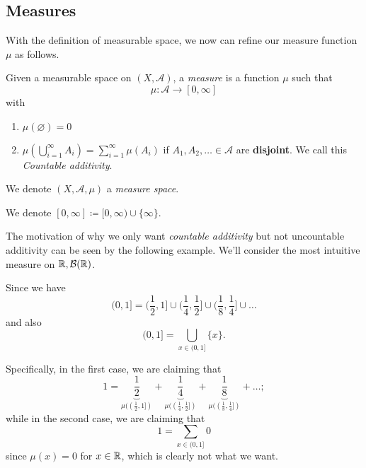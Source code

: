 \subsection{Measures}
With the definition of measurable space, we now can refine our measure function \(\mu\) as follows.
\begin{definition}[Measure]\label{def:measure}
	Given a measurable space on \((X, \mathcal{A}) \), a \emph{measure} is a function \(\mu\) such that
	\[
		\mu\colon \mathcal{A} \to [0, \infty]
	\]
	with
	\begin{enumerate}
		\item\label{def:measure-empty-measure} \(\mu(\varnothing ) = 0\)
		\item\label{def:measure-countable-additivity} \(\mu\left(\bigcup\limits_{i=1}^{\infty} A_{i}\right) = \sum\limits_{i=1}^{\infty}\mu(A_{i})\) if \(A_1, A_2, \ldots \in \mathcal{A}\)
		are \textbf{disjoint}. We call this \emph{Countable additivity}.
	\end{enumerate}
	We denote \((X, \mathcal{A} , \mu)\) a \emph{measure space}\label{def:measure-space}.
\end{definition}

\begin{notation}
	We denote \([0, \infty] \coloneqq [0, \infty) \cup \{\infty\}\).
\end{notation}

\begin{remark}
	The motivation of why we only want \emph{countable additivity} but not uncountable additivity can be seen by the following example. We'll consider
	the most intuitive measure on \(\mathbb{\MakeUppercase{R}} , \mathcal{B} (\mathbb{\MakeUppercase{R}})\).

	Since we have
	\[
		(0, 1] = (\frac{1}{2}, 1]\cup (\frac{1}{4}, \frac{1}{2}]\cup (\frac{1}{8}, \frac{1}{4}]\cup \ldots
	\]
	and also
	\[
		(0, 1] = \bigcup\limits_{x\in (0, 1]}\{x\}.
	\]

	Specifically, in the first case, we are claiming that
	\[
		1 = \underbrace{\frac{1}{2}}_{\mu((\frac{1}{2}, 1])} + \underbrace{\frac{1}{4}}_{\mu((\frac{1}{4}, \frac{1}{2}])} + \underbrace{\frac{1}{8}}_{\mu((\frac{1}{8}, \frac{1}{4}])}  + \ldots  ;
	\]
	while in the second case, we are claiming that
	\[
		1 = \sum\limits_{x\in(0, 1]} 0
	\]
	since \(\mu(x) = 0\) for \(x\in \mathbb{\MakeUppercase{R}} \), which is clearly not what we want.
\end{remark}

